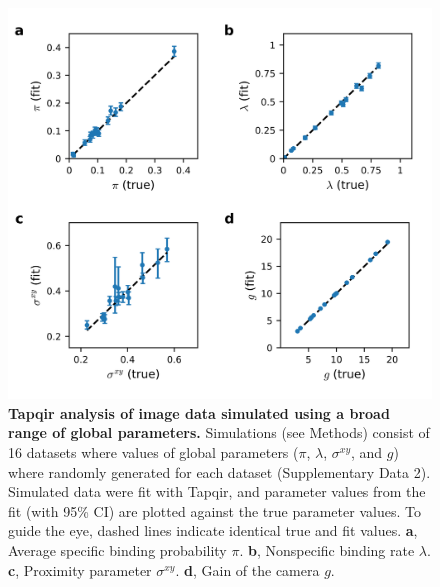 \begin{figure}[h]
\centering
\includegraphics[width=\textwidth]{extended-data/figure3/figure2.png}
\caption{\textbf{Tapqir analysis of image data simulated using a broad range of global parameters.} Simulations (see Methods) consist of 16 datasets where values of global parameters ($\pi$, $\lambda$, $\sigma^{xy}$, and $g$) where randomly generated for each dataset (Supplementary Data 2). Simulated data were fit with Tapqir, and parameter values from the fit (with 95\% CI) are plotted against the true parameter values. To guide the eye, dashed lines  indicate identical true and fit values. \textbf{a}, Average specific binding probability $\pi$. \textbf{b}, Nonspecific binding rate $\lambda$. \textbf{c}, Proximity parameter $\sigma^{xy}$. \textbf{d}, Gain of the camera $g$. }
\label{fig:tapqir_global}
\end{figure}
\pagebreak

